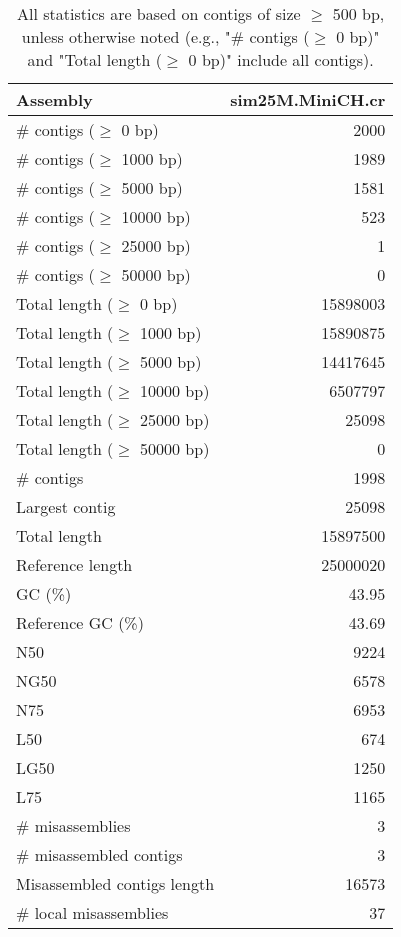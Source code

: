 \documentclass[12pt,a4paper]{article}
\begin{document}
\begin{table}[ht]
\begin{center}
\caption{All statistics are based on contigs of size $\geq$ 500 bp, unless otherwise noted (e.g., "\# contigs ($\geq$ 0 bp)" and "Total length ($\geq$ 0 bp)" include all contigs).}
\begin{tabular}{|l*{1}{|r}|}
\hline
Assembly & sim25M.MiniCH.cr \\ \hline
\# contigs ($\geq$ 0 bp) & 2000 \\ \hline
\# contigs ($\geq$ 1000 bp) & 1989 \\ \hline
\# contigs ($\geq$ 5000 bp) & 1581 \\ \hline
\# contigs ($\geq$ 10000 bp) & 523 \\ \hline
\# contigs ($\geq$ 25000 bp) & 1 \\ \hline
\# contigs ($\geq$ 50000 bp) & 0 \\ \hline
Total length ($\geq$ 0 bp) & 15898003 \\ \hline
Total length ($\geq$ 1000 bp) & 15890875 \\ \hline
Total length ($\geq$ 5000 bp) & 14417645 \\ \hline
Total length ($\geq$ 10000 bp) & 6507797 \\ \hline
Total length ($\geq$ 25000 bp) & 25098 \\ \hline
Total length ($\geq$ 50000 bp) & 0 \\ \hline
\# contigs & 1998 \\ \hline
Largest contig & 25098 \\ \hline
Total length & 15897500 \\ \hline
Reference length & 25000020 \\ \hline
GC (\%) & 43.95 \\ \hline
Reference GC (\%) & 43.69 \\ \hline
N50 & 9224 \\ \hline
NG50 & 6578 \\ \hline
N75 & 6953 \\ \hline
L50 & 674 \\ \hline
LG50 & 1250 \\ \hline
L75 & 1165 \\ \hline
\# misassemblies & 3 \\ \hline
\# misassembled contigs & 3 \\ \hline
Misassembled contigs length & 16573 \\ \hline
\# local misassemblies & 37 \\ \hline

\end{tabular}
\end{center}
\end{table}
\end{document}
